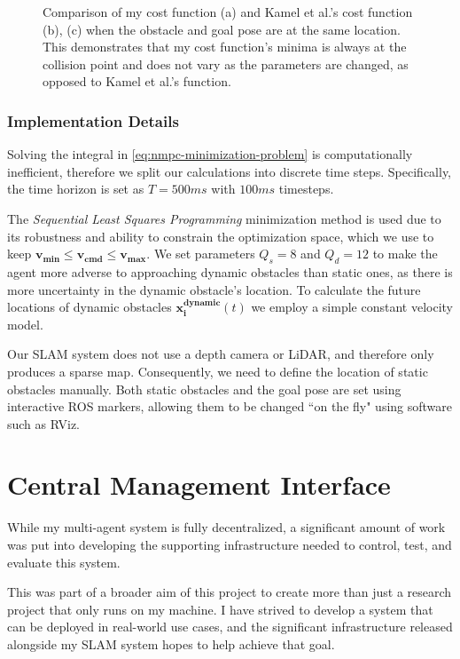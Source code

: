 \begin{figure}[h]
    \caption{Comparison of my cost function (a) and Kamel et al.'s cost function (b), (c) when the obstacle and goal pose are at the same location. This demonstrates that my cost function's minima is always at the collision point and does not vary as the parameters are changed, as opposed to Kamel et al.'s function.}
    \label{fig:nmpc_cost_function}
\end{figure}

\subsubsection{Implementation Details}
\label{sec:nmpc-implementation-details}
Solving the integral in \autoref{eq:nmpc-minimization-problem} is computationally inefficient, therefore we split our calculations into discrete time steps. Specifically, the time horizon is set as $T=500ms$ with $100ms$ timesteps.

The \textit{Sequential Least Squares Programming} minimization method is used due to its robustness and ability to constrain the optimization space, which we use to keep $\bm{v_{min}} \leq \bm{v_{cmd}} \leq \bm{v_{max}}$. We set parameters $Q_s = 8$ and $Q_d = 12$ to make the agent more adverse to approaching dynamic obstacles than static ones, as there is more uncertainty in the dynamic obstacle's location. To calculate the future locations of dynamic obstacles $\bm{x_i^{dynamic}}(t)$ we employ a simple constant velocity model.

Our SLAM system does not use a depth camera or LiDAR, and therefore only produces a sparse map. Consequently, we need to define the location of static obstacles manually. Both static obstacles and the goal pose are set using interactive ROS markers, allowing them to be changed ``on the fly" using software such as RViz.

\section{Central Management Interface}
\label{sec:central-management-interface}
While my multi-agent system is fully decentralized, a significant amount of work was put into developing the supporting infrastructure needed to control, test, and evaluate this system.

This was part of a broader aim of this project to create more than just a research project that only runs on my machine. I have strived to develop a system that can be deployed in real-world use cases, and the significant infrastructure released alongside my SLAM system hopes to help achieve that goal.

